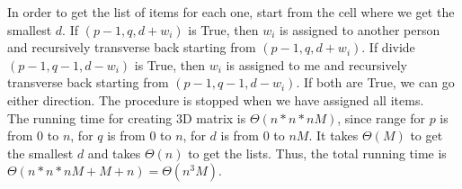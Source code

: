 \documentclass[10pt]{article}
\begin{document}
In order to get the list of items for each one, start from the cell where we get the smallest $d$. If $(p-1, q, d+w_i)$ is True, then $w_i$ is assigned to another person and recursively transverse back starting from $(p-1, q, d+w_i)$. If divide$(p-1, q-1, d-w_i)$ is True, then $w_i$ is assigned to me and recursively transverse back starting from $(p-1, q-1, d-w_i)$. If both are True, we can go either direction. The procedure is stopped when we have assigned all items. \\
The running time for creating 3D matrix is $\Theta(n*n*nM)$, since range for $p$ is from $0$ to $n$, for $q$ is from $0$ to $n$, for $d$ is from $0$ to $nM$. It takes $\Theta(M)$ to get the smallest $d$ and takes $\Theta(n)$ to get the lists. Thus, the total running time is $\Theta(n*n*nM + M + n) = \Theta (n^3M)$.
%
%
\end{document}
